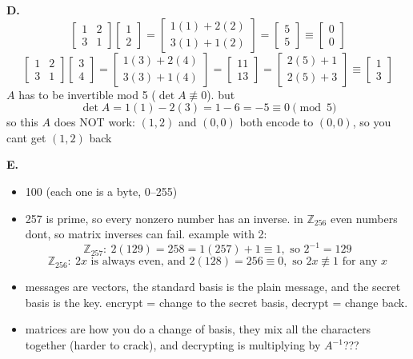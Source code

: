 \documentclass{article}
\begin{document}
\textbf{D.}
\[
\begin{bmatrix}1&2\\3&1\end{bmatrix}\begin{bmatrix}1\\2\end{bmatrix}
=
\begin{bmatrix}1(1) + 2(2) \\ 3(1) + 1(2)\end{bmatrix}
=
\begin{bmatrix}5\\5\end{bmatrix}
\equiv \boxed{\begin{bmatrix}0\\0\end{bmatrix}}
\]
\[
\begin{bmatrix}1&2\\3&1\end{bmatrix}\begin{bmatrix}3\\4\end{bmatrix}
=
\begin{bmatrix}1(3) + 2(4) \\ 3(3) + 1(4)\end{bmatrix}
=
\begin{bmatrix}11\\13\end{bmatrix}
=
\begin{bmatrix}2(5) + 1 \\ 2(5) + 3\end{bmatrix}
\equiv \boxed{\begin{bmatrix}1\\3\end{bmatrix}}
\]
$A$ has to be invertible mod 5 ($\det A \not\equiv 0$). but
\[
\det A = 1(1) - 2(3) = 1 - 6 = -5 \equiv 0 \pmod 5
\]
so this $A$ does NOT work: $(1,2)$ and $(0,0)$ both encode to $(0,0)$, so you cant get $(1,2)$ back

\textbf{E.}
\begin{itemize}
  \item[i.] 100 (each one is a byte, 0--255)
  \item[ii.] 257 is prime, so every nonzero number has an inverse. in $\mathbb{Z}_{256}$ even numbers dont, so matrix inverses can fail. example with 2:
  \[
  \mathbb{Z}_{257}:\ 2(129) = 258 = 1(257) + 1 \equiv 1, \text{ so } 2^{-1} = 129
  \]
  \[
  \mathbb{Z}_{256}:\ 2x \text{ is always even, and } 2(128) = 256 \equiv 0, \text{ so } 2x \not\equiv 1 \text{ for any } x
  \]
  \item[iii.] messages are vectors, the standard basis is the plain message, and the secret basis is the key. encrypt = change to the secret basis, decrypt = change back.
  \item[iv.] matrices are how you do a change of basis, they mix all the characters together (harder to crack), and decrypting is multiplying by $A^{-1}$???
\end{itemize}
\end{document}
